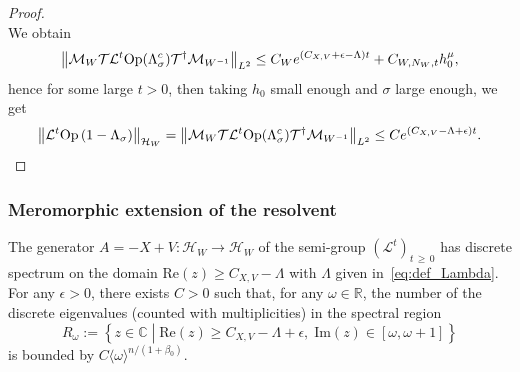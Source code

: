 \documentclass[10pt]{amsart}
\theoremstyle{definition}\newtheorem{defi}[theo]{Definition}\newtheorem{rema}[theo]{Remark}\newtheorem{exam}[theo]{Example}\newtheorem{exem}[theo]{Example}\newtheorem{nota}[theo]{Notation}
\newcommand{\clT}{\mathcal{T}}
\newcommand{\clH}{\mathcal{H}}
\newcommand{\clL}{\mathcal{L}}
\newcommand{\clM}{\mathcal{M}}
\newcommand{\Ree}{\mathrm{Re}}
\newcommand{\Imm}{\mathrm{Im}}
\newcommand{\Opp}{\mathrm{Op}}
\newcommand{\bbR}{\mathbb{R}}
\newcommand{\bbC}{\mathbb{C}}
\begin{document}
\begin{proof}
\[\]
We obtain
\[
\left\Vert \clM_{W}\text{\ensuremath{\clT}\ensuremath{\clL^{t}}\textrm{Op}\ensuremath{\left(\Lambda_{\sigma}^{c}\right)}\ensuremath{\ensuremath{\clT^{\dagger}}}}\clM_{W^{-1}}\right\Vert _{L^{2}}\le C_{W}e^{(C_{X,V}+\epsilon-\Lambda)t}+C_{W,N_{W},t}h_{0}^{\mu},
\]
hence for some large $t>0$, then taking $h_{0}$ small enough and $\sigma$ large enough, we get
\[
\left\Vert \clL^{t}\Opp \left(1-\Lambda_{\sigma}\right)\right\Vert _{\clH _{W}}=\left\Vert \clM_{W}\text{\ensuremath{\clT}\ensuremath{\clL^{t}}\textrm{Op}\ensuremath{\left(\Lambda_{\sigma}^{c}\right)}\ensuremath{\ensuremath{\clT^{\dagger}}}}\clM_{W^{-1}}\right\Vert _{L^{2}}\le Ce^{(C_{X,V}-\Lambda+\epsilon)t}.\qedhere
\]
\end{proof}

\subsubsection{Meromorphic extension of the resolvent}

\begin{cBoxB}{}
\begin{prop}\label{prop:discrete_spectrum}
The generator $A=-X+V:\clH _{W}\rightarrow\clH _{W}$ of the semi-group $(\clL^{t})_{t\,\geq\,0}$ has discrete spectrum on the domain $\Ree(z)\geq C_{X,V}-\Lambda$ with $\Lambda$ given in~\eqref{eq:def_Lambda}. For any $\epsilon>0$, there exists $C>0$ such that, for any $\omega\in\bbR$, the number of the discrete eigenvalues (counted with multiplicities) in the spectral region
\begin{equation}\label{eq:def_region_R}
R_{\omega}:=\left\{ z\in\bbC\;\left|\;\Ree\left(z\right)\geq C_{X,V}-\Lambda+\epsilon,\;\Imm(z)\in\left[\omega,\omega+1\right]\right.\right\} 
\end{equation}
is bounded by $C\langle \omega\rangle ^{n/(1+\beta_{0})}$.
\end{prop}
\end{cBoxB}
\end{document}
